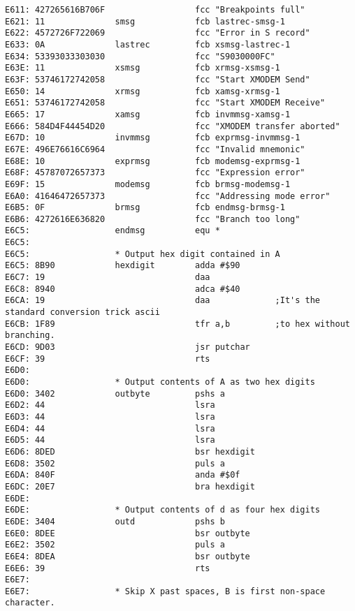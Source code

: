 {\begin{verbatim}
E611: 427265616B706F                  fcc "Breakpoints full"
E621: 11              smsg            fcb lastrec-smsg-1
E622: 4572726F722069                  fcc "Error in S record"
E633: 0A              lastrec         fcb xsmsg-lastrec-1
E634: 53393033303030                  fcc "S9030000FC"
E63E: 11              xsmsg           fcb xrmsg-xsmsg-1
E63F: 53746172742058                  fcc "Start XMODEM Send"
E650: 14              xrmsg           fcb xamsg-xrmsg-1
E651: 53746172742058                  fcc "Start XMODEM Receive"
E665: 17              xamsg           fcb invmmsg-xamsg-1
E666: 584D4F44454D20                  fcc "XMODEM transfer aborted"
E67D: 10              invmmsg         fcb exprmsg-invmmsg-1
E67E: 496E76616C6964                  fcc "Invalid mnemonic"
E68E: 10              exprmsg         fcb modemsg-exprmsg-1
E68F: 45787072657373                  fcc "Expression error"
E69F: 15              modemsg         fcb brmsg-modemsg-1
E6A0: 41646472657373                  fcc "Addressing mode error"             
E6B5: 0F              brmsg           fcb endmsg-brmsg-1
E6B6: 4272616E636820                  fcc "Branch too long"
E6C5:                 endmsg          equ *
E6C5:                 
E6C5:                 * Output hex digit contained in A
E6C5: 8B90            hexdigit        adda #$90
E6C7: 19                              daa
E6C8: 8940                            adca #$40
E6CA: 19                              daa             ;It's the standard conversion trick ascii
E6CB: 1F89                            tfr a,b         ;to hex without branching.
E6CD: 9D03                            jsr putchar
E6CF: 39                              rts
E6D0:                 
E6D0:                 * Output contents of A as two hex digits 
E6D0: 3402            outbyte         pshs a          
E6D2: 44                              lsra
E6D3: 44                              lsra
E6D4: 44                              lsra
E6D5: 44                              lsra
E6D6: 8DED                            bsr hexdigit
E6D8: 3502                            puls a
E6DA: 840F                            anda #$0f
E6DC: 20E7                            bra hexdigit
E6DE:                 
E6DE:                 * Output contents of d as four hex digits 
E6DE: 3404            outd            pshs b   
E6E0: 8DEE                            bsr outbyte
E6E2: 3502                            puls a
E6E4: 8DEA                            bsr outbyte
E6E6: 39                              rts
E6E7:                 
E6E7:                 * Skip X past spaces, B is first non-space character.

\end{verbatim}}
